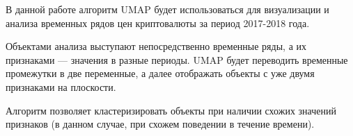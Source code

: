 В данной работе алгоритм UMAP будет использоваться для визуализации и анализа временных рядов цен криптовалюты за период 2017-2018 года.

Объектами анализа выступают непосредственно временные ряды, а их признаками --- значения в разные периоды. UMAP будет переводить временные промежутки в две переменные, а далее отображать объекты с уже двумя признаками на плоскости.

Алгоритм позволяет кластеризировать объекты при наличии схожих значений признаков (в данном случае, при схожем поведении в течение времени).